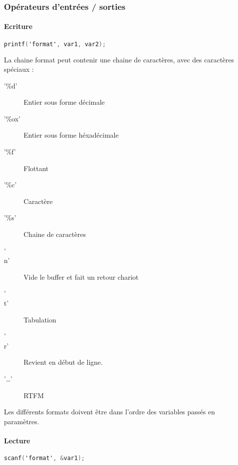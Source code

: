 \documentclass[12pt,a4paper,openany]{article}
\begin{document}
\subsubsection{Opérateurs d'entrées / sorties}
\paragraph{Ecriture}
\begin{lstlisting}[language=C, caption=Syntaxe de déclaration de variable]
	printf('format', var1, var2);
\end{lstlisting}
La chaine format peut contenir une chaine de caractères, avec des caractères spéciaux : 
\begin{description}
	\item['\%d'] Entier sous forme décimale
	\item['\%ox'] Entier sous forme héxadécimale
	\item['\%f'] Flottant 
	\item['\%c'] Caractère 
	\item['\%s'] Chaine de caractères 
	\item['\\n'] Vide le buffer et fait un retour chariot 
	\item['\\t'] Tabulation 
	\item['\\r'] Revient en début de ligne.
	\item['\ldots'] RTFM	
\end{description}
Les différents formats doivent être dans l'ordre des variables passés en paramètres.
\paragraph{Lecture}
\begin{lstlisting}[language=C, caption=Syntaxe de déclaration de variable]
	scanf('format', &var1);
\end{lstlisting}


\end{document}
